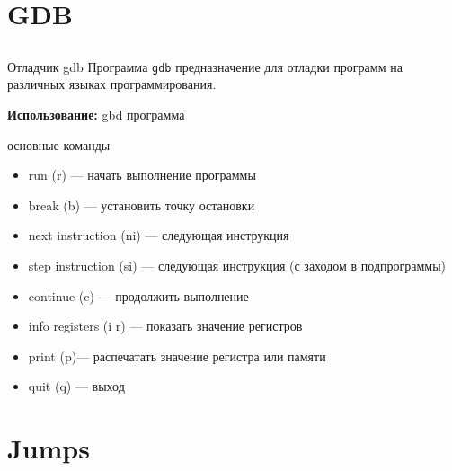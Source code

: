 \documentclass{beamer}
\begin{document}
    \section{GDB}
    \subsection{}
    \begin{frame}{Отладчик gdb}
    Программа {\tt gdb} предназначение для отладки программ на различных языках программирования.

    {\bf Использование:} gbd программа
    \begin{block}{основные команды}
        \begin{itemize}
            \item run (r) --- начать выполнение программы
            \item break (b) --- установить точку остановки
            \item next instruction (ni) --- следующая инструкция
            \item step instruction (si) --- следующая инструкция (с заходом в подпрограммы)
            \item continue (c) --- продолжить выполнение
            \item info registers (i r) --- показать значение регистров
            \item print (p)--- распечатать значение регистра или памяти
            \item quit (q) --- выход
        \end{itemize}
    \end{block}
    \end{frame}
    \section{Jumps}
\end{document}
